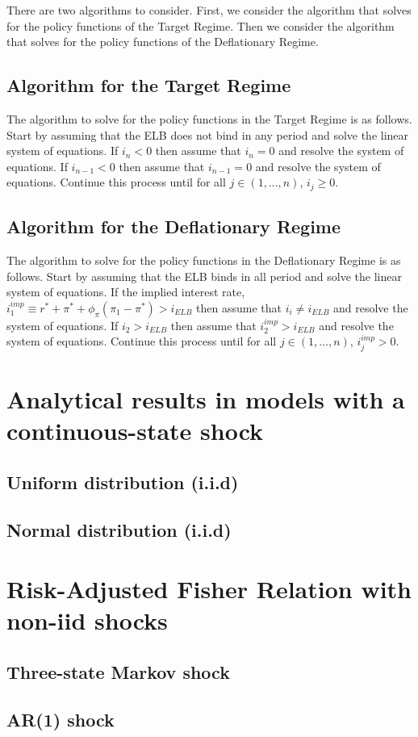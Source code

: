 \documentclass[11pt]{article}
\begin{document}
\begin{singlespace}
		There are two algorithms to consider. First, we consider the algorithm that solves for the policy functions of the Target Regime. Then we consider the algorithm that solves for the policy functions of the Deflationary Regime.
		
		\subsection{Algorithm for the Target Regime}
		The algorithm to solve for the policy functions in the Target Regime is as follows. Start by assuming that the ELB does not bind in any period and solve the linear system of equations. If $i_n < 0$ then assume that $i_n = 0$ and resolve the system of equations. If $i_{n-1} < 0$ then assume that $i_{n-1} = 0$ and resolve the system of equations. Continue this process until for all $j\in(1,\dots,n)$, $i_j \ge 0$. 
		
		\subsection{Algorithm for the Deflationary Regime}
		The algorithm to solve for the policy functions in the Deflationary Regime is as follows. Start by assuming that the ELB binds in all period and solve the linear system of equations. If the implied interest rate, $i_1^{imp} \equiv r^* + \pi^* + \phi_{\pi}(\pi_1 - \pi^*) > i_{ELB}$ then assume that $i_i \ne i_{ELB}$ and resolve the system of equations. If $i_{2} > i_{ELB}$ then assume that $i_2^{imp} > i_{ELB}$ and resolve the system of equations. Continue this process until for all $j\in(1,\dots,n)$, $i_j^{imp} > 0$. 
		
		\section{Analytical results in models with a continuous-state shock}
		
		\subsection{Uniform distribution (i.i.d)}
		
		
		\subsection{Normal distribution (i.i.d)}
		
		
		\section{Risk-Adjusted Fisher Relation with non-iid shocks}
		
		\subsection{Three-state Markov shock}
		
		
		\subsection{AR(1) shock}
		
		
		
	\end{singlespace}
	
	
\end{document}
